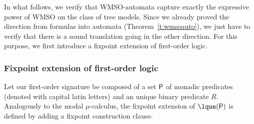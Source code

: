 
In what follows, we verify that WMSO-automata capture exactly the expressive power of WMSO on the class of tree models. Since we already proved the direction from formulas into automata (Theorem~\ref{t:wmsoauto}), we just have to verify that there is a sound translation going in the other direction.
For this purpose, we first introduce a fixpoint extension of first-order logic.

\subsubsection{Fixpoint extension of  first-order logic}

Let our first-order signature be composed of a set $\mathsf{P}$ of monadic predicates (denoted with capital latin letters) and an unique binary predicate $R$.
%
%
%
%
Analogously to the modal $\mu$-calculus, the fixpoint extension of $\lque(\prop)$ is defined by adding a fixpoint construction clause.

